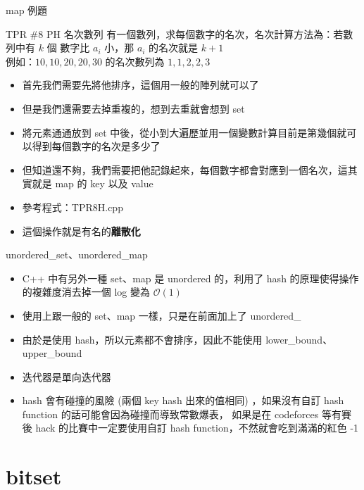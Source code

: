 \documentclass[aspectratio=169]{beamer}
\begin{document}
    
    \begin{frame}{map 例題}
        \begin{block}{TPR \#8 PH 名次數列}
            有一個數列，求每個數字的名次，名次計算方法為：若數列中有 $k$ 個 數字比 $a_i$ 小，那 $a_i$ 的名次就是 $k + 1$\\
            例如：${10, 10, 20, 20, 30}$ 的名次數列為 $1, 1, 2, 2, 3$
        \end{block}

        \begin{itemize}
            \item<2-> 首先我們需要先將他排序，這個用一般的陣列就可以了
            \item<3-> 但是我們還需要去掉重複的，想到去重就會想到 set
            \item<4-> 將元素通通放到 set 中後，從小到大遍歷並用一個變數計算目前是第幾個就可以得到每個數字的名次是多少了
            \item<5-> 但知道還不夠，我們需要把他記錄起來，每個數字都會對應到一個名次，這其實就是 map 的 key 以及 value
            \item<6-> 參考程式：TPR8H.cpp
            \item<6-> 這個操作就是有名的\textbf{離散化}
        \end{itemize}
    \end{frame}

    \begin{frame}{unordered\_set、unordered\_map}
        \begin{itemize}
            \item<1-> C++ 中有另外一種 set、map 是 unordered 的，利用了 hash 的原理使得操作的複雜度消去掉一個 log 變為 $\mathcal{O}(1)$
            \item<1-> 使用上跟一般的 set、map 一樣，只是在前面加上了 unordered\_
            \item<2-> 由於是使用 hash，所以元素都不會排序，因此不能使用 lower\_bound、upper\_bound 
            \item<2-> 迭代器是單向迭代器
            \item<3-> hash 會有碰撞的風險 (兩個 key hash 出來的值相同) ，如果沒有自訂 hash function 的話可能會因為碰撞而導致常數爆表，
            如果是在 codeforces 等有賽後 hack 的比賽中一定要使用自訂 hash function，不然就會吃到滿滿的紅色 -1
        \end{itemize}
    \end{frame}

    \section{bitset}
\end{document}
